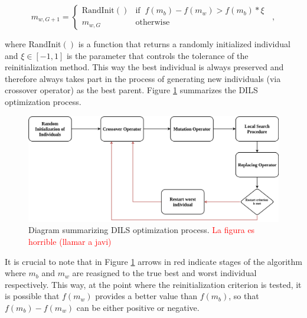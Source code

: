 \documentclass[review]{elsarticle}
\begin{document}
\begin{equation}
m_{w,G+1} = \left\{ \begin{array}{lc}
\text{RandInit}() &   \text{if} \;\; f(m_b) - f(m_w) > f(m_b) * \xi \;\;\\
m_{w,G} &  \text{otherwise}
\end{array}
\right.,
\label{eq2}
\end{equation}

\noindent where RandInit$()$ is a function that returns a randomly initialized individual and $\xi \in [-1,1]$ is the parameter that controls the tolerance of the reinitialization method. This way the best individual is always preserved and therefore always takes part in the process of generating new individuals (via crossover operator) as the best parent. Figure \ref{img:DILS_diag} summarizes the DILS optimization process.

\begin{figure}[!h]
	\centering
	\includegraphics[scale=0.25]{Figures/DILSDiagram.png}
	\caption{Diagram summarizing DILS optimization process. \textcolor{red}{La figura es horrible (llamar a javi)}}\label{img:DILS_diag}
\end{figure}

It is crucial to note that in Figure \ref{img:DILS_diag} arrows in red indicate stages of the algorithm where $m_b$ and $m_w$ are reasigned to the true best and worst individual respectively. This way, at the point where the reinitialization criterion is tested, it is possible that $f(m_w)$ provides a better value than $f(m_b)$, so that $f(m_b) - f(m_w)$ can be either positive or negative. 
\end{document}
